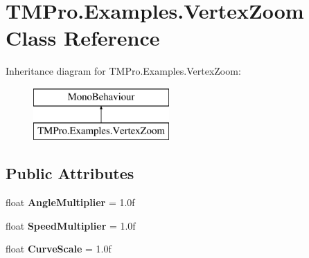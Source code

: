 \hypertarget{class_t_m_pro_1_1_examples_1_1_vertex_zoom}{}\section{T\+M\+Pro.\+Examples.\+Vertex\+Zoom Class Reference}
\label{class_t_m_pro_1_1_examples_1_1_vertex_zoom}
Inheritance diagram for T\+M\+Pro.\+Examples.\+Vertex\+Zoom\+:\begin{figure}[H]
\begin{center}
\leavevmode
\includegraphics[height=2.000000cm]{class_t_m_pro_1_1_examples_1_1_vertex_zoom}
\end{center}
\end{figure}
\subsection*{Public Attributes}
\begin{DoxyCompactItemize}
\item 
\mbox{\label{class_t_m_pro_1_1_examples_1_1_vertex_zoom_aae60c19f9d9352acb093ae262c0759a5}} 
float {\bfseries Angle\+Multiplier} = 1.\+0f
\item 
\mbox{\label{class_t_m_pro_1_1_examples_1_1_vertex_zoom_a4ba5dc7acf25ea2b07b1b872050b9fa3}} 
float {\bfseries Speed\+Multiplier} = 1.\+0f
\item 
\mbox{\label{class_t_m_pro_1_1_examples_1_1_vertex_zoom_aaaaaeb0655b1d974a085b416c2e13522}} 
float {\bfseries Curve\+Scale} = 1.\+0f
\end{DoxyCompactItemize}
